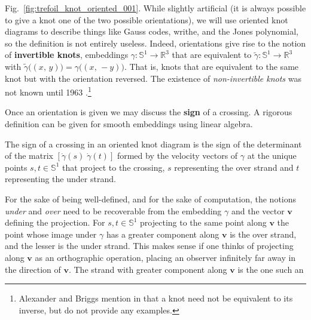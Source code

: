         Fig.~\ref{fig:trefoil_knot_oriented_001}. While slightly artificial (it
        is always possible to give a knot one of the two possible
        orientations), we will use oriented knot diagrams to describe
        things like Gauss codes, writhe, and the Jones polynomial, so the
        definition is not entirely useless. Indeed, orientations give rise to
        the notion of \textbf{invertible knots}, embeddings
        $\gamma:\mathbb{S}^{1}\rightarrow\mathbb{R}^{3}$ that are equivalent to
        $\tilde{\gamma}:\mathbb{S}^{1}\rightarrow\mathbb{R}^{3}$ with
        $\tilde{\gamma}\big((x,\,y)\big)=\gamma\big((x,\,-y)\big)$. That is,
        knots that are equivalent to the same knot but with the orientation
        reversed. The existence of \textit{non-invertible knots} was not
        known until 1963 \cite{TrotterInvertibleKnots1963}.\footnote{%
            Alexander and Briggs mention in
            \cite[p.~563-564]{AlexanderBriggs1926} that a knot need not
            be equivalent to its inverse, but do not provide any examples.
        }
        \par\hfill\par
        Once an orientation is given we may discuss the \textbf{sign} of a
        crossing. A rigorous definition can be given for smooth embeddings using
        linear algebra.
        \begin{definition}
            The sign of a crossing in an oriented knot diagram is the sign of
            the determinant of the matrix $[\dot{\gamma}(s)\;\dot{\gamma}(t)]$
            formed by the velocity vectors of $\gamma$ at the unique points
            $s,t\in\mathbb{S}^{1}$ that project to the crossing, $s$
            representing the over strand and $t$ representing the under strand.
        \end{definition}
        For the sake of being well-defined, and for the sake of computation, the
        notions \textit{under} and \textit{over} need to be recoverable from the
        embedding $\gamma$ and the vector $\mathbf{v}$ defining the projection.
        For $s,t\in\mathbb{S}^{1}$ projecting to the same point along
        $\mathbf{v}$ the point whose image under $\gamma$ has a greater
        component along $\mathbf{v}$ is the over strand, and the lesser
        is the under strand. This makes sense if one thinks of projecting
        along $\mathbf{v}$ as an orthographic operation, placing an observer
        infinitely far away in the direction of $\mathbf{v}$. The strand
        with greater component along $\mathbf{v}$ is the one such an
